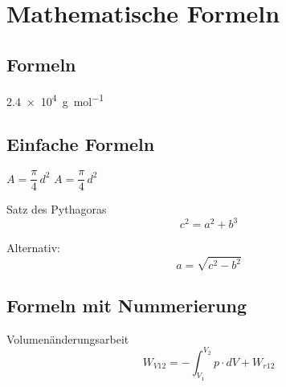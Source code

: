 \chapter{Mathematische Formeln}
	
	\section{Formeln}
		\SI{2,4e4}{\gram \per \mole}
	
	\section{Einfache Formeln}
		\begin{math}
			A = \dfrac{\pi}{4}\,d^2
		\end{math}
		\newline
		\(A = \dfrac{\pi}{4}\,d^2\)
	
		Satz des Pythagoras
		\begin{displaymath}
			c^2 = a^2 + b^3
		\end{displaymath}
		
		Alternativ:
		\[
			a = \sqrt{c^2 - b^2}
		\]
		
	\section{Formeln mit Nummerierung}
		Volumenänderungsarbeit
		\begin{equation}
			W_{V12} = - \int_{V_1}^{V_2} p \cdot dV + W_{r12}
		\end{equation}
		
